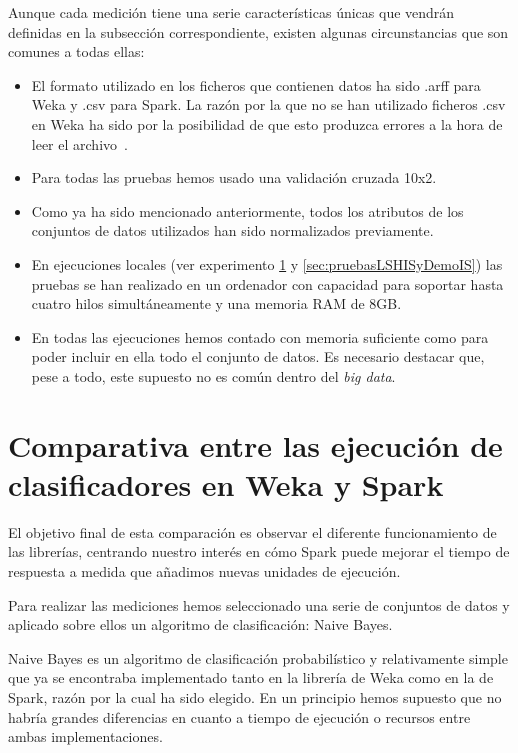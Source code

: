 Aunque cada medición tiene una serie características únicas que vendrán definidas en la subsección correspondiente, existen algunas circunstancias que son comunes a todas ellas:

\begin{itemize}
	\item El formato utilizado en los ficheros que contienen datos ha sido .arff para Weka y .csv para Spark. La razón por la que no se han utilizado ficheros .csv en Weka ha sido por la posibilidad de que esto produzca errores a la hora de leer el archivo~\cite{CSVWeka}.
	\item Para todas las pruebas hemos usado una validación cruzada 10x2.
	\item Como ya ha sido mencionado anteriormente, todos los atributos de los conjuntos de datos utilizados han sido normalizados previamente.
	\item En ejecuciones locales (ver experimento \ref{sec:wekaSparkComp} y \ref{sec:pruebasLSHISyDemoIS}) las pruebas se han realizado en un ordenador con capacidad para soportar hasta cuatro hilos simultáneamente y una memoria RAM de 8GB.
	\item En todas las ejecuciones hemos contado con memoria suficiente como para poder incluir en ella todo el conjunto de datos. Es necesario destacar que, pese a todo, este supuesto no es común dentro del \textit{big data}.
	
\end{itemize}



\section{Comparativa entre las ejecución de clasificadores en Weka y Spark}\label{sec:wekaSparkComp}

El objetivo final de esta comparación es observar el diferente funcionamiento de las librerías, centrando nuestro interés en cómo Spark puede mejorar el tiempo de respuesta a medida que añadimos nuevas unidades de ejecución.

Para realizar las mediciones hemos seleccionado una serie de conjuntos de datos y aplicado sobre ellos un algoritmo de clasificación: Naive Bayes.

Naive Bayes es un algoritmo de clasificación probabilístico y relativamente simple que ya se encontraba implementado tanto en la librería de Weka como en la de Spark, razón por la cual ha sido elegido. En un principio hemos supuesto que no habría grandes diferencias en cuanto a tiempo de ejecución o recursos entre ambas implementaciones.


